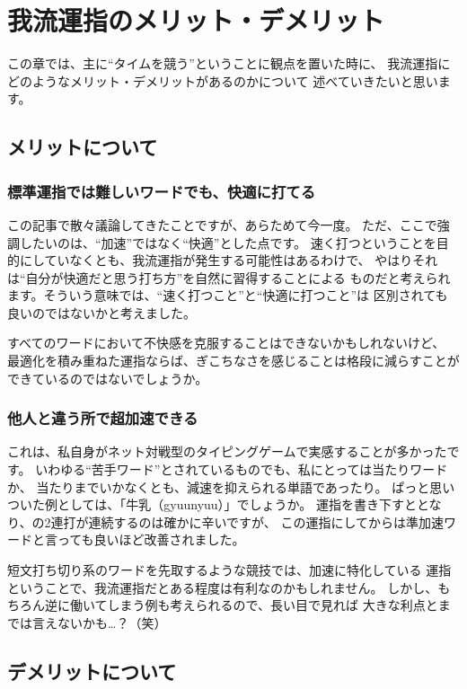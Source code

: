 \section{我流運指のメリット・デメリット}

この章では、主に“タイムを競う”ということに観点を置いた時に、
我流運指にどのようなメリット・デメリットがあるのかについて
述べていきたいと思います。


\subsection{メリットについて}

\subsubsection*{標準運指では難しいワードでも、快適に打てる}

この記事で散々議論してきたことですが、あらためて今一度。
ただ、ここで強調したいのは、“加速”ではなく“快適”とした点です。
速く打つということを目的にしていなくとも、我流運指が発生する可能性はあるわけで、
やはりそれは“自分が快適だと思う打ち方”を自然に習得することによる
ものだと考えられます。そういう意味では、“速く打つこと”と“快適に打つこと”は
区別されても良いのではないかと考えました。

すべてのワードにおいて不快感を克服することはできないかもしれないけど、
最適化を積み重ねた運指ならば、ぎこちなさを感じることは格段に減らすことが
できているのではないでしょうか。

\subsubsection*{他人と違う所で超加速できる}

これは、私自身がネット対戦型のタイピングゲームで実感することが多かったです。
いわゆる“苦手ワード”とされているものでも、私にとっては当たりワードか、
当たりまでいかなくとも、減速を抑えられる単語であったり。
ぱっと思いついた例としては、「牛乳（gyuunyuu）」でしょうか。
運指を書き下すととなり、の2連打が連続するのは確かに辛いですが、
この運指にしてからは準加速ワードと言っても良いほど改善されました。

短文打ち切り系のワードを先取するような競技では、加速に特化している
運指ということで、我流運指だとある程度は有利なのかもしれません。
しかし、もちろん逆に働いてしまう例も考えられるので、長い目で見れば
大きな利点とまでは言えないかも…？（笑）


\subsection{デメリットについて}

